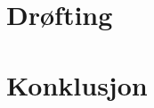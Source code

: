 \documentclass[main.tex]{subfiles}
\begin{document}
\section*{Drøfting}
\label{sec:5}

\section*{Konklusjon}
\label{sec:6}
\end{document}
